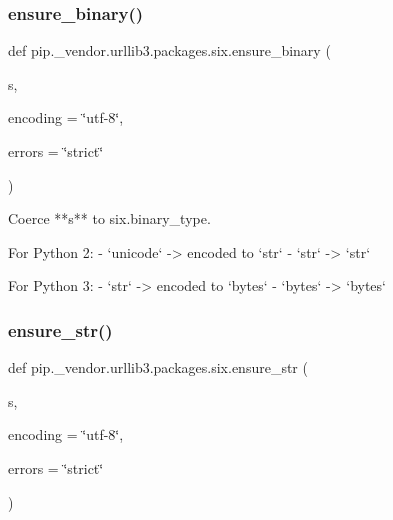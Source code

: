 \mbox{\label{namespacepip_1_1__vendor_1_1urllib3_1_1packages_1_1six_a1cdd7c825a9d86f7bce57a5223e8d305}} 
\subsubsection{\texorpdfstring{ensure\+\_\+binary()}{ensure\_binary()}}
{\footnotesize\ttfamily def pip.\+\_\+vendor.\+urllib3.\+packages.\+six.\+ensure\+\_\+binary (\begin{DoxyParamCaption}\item[{}]{s,  }\item[{}]{encoding = {\ttfamily \char`\"{}utf-\/8\char`\"{}},  }\item[{}]{errors = {\ttfamily \char`\"{}strict\char`\"{}} }\end{DoxyParamCaption})}

\begin{DoxyVerb}Coerce **s** to six.binary_type.

For Python 2:
  - `unicode` -> encoded to `str`
  - `str` -> `str`

For Python 3:
  - `str` -> encoded to `bytes`
  - `bytes` -> `bytes`
\end{DoxyVerb}
 \mbox{\label{namespacepip_1_1__vendor_1_1urllib3_1_1packages_1_1six_a75cfaee3f7a2bf3780de74593247dd35}} 
\subsubsection{\texorpdfstring{ensure\+\_\+str()}{ensure\_str()}}
{\footnotesize\ttfamily def pip.\+\_\+vendor.\+urllib3.\+packages.\+six.\+ensure\+\_\+str (\begin{DoxyParamCaption}\item[{}]{s,  }\item[{}]{encoding = {\ttfamily \char`\"{}utf-\/8\char`\"{}},  }\item[{}]{errors = {\ttfamily \char`\"{}strict\char`\"{}} }\end{DoxyParamCaption})}

